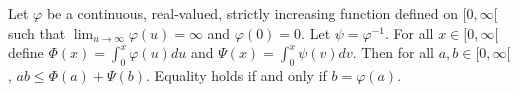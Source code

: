 Let $\varphi$ be a continuous, real-valued, strictly increasing function defined on $[0, \infty[$ such that $\lim_{u \to \infty} \varphi(u) = \infty$ and $\varphi(0) = 0$. Let $\psi = \varphi^{-1}$. For all $x \in [0, \infty[$ define $\Phi(x) = \int_0^x \varphi(u) du$ and $\Psi(x) = \int_0^x \psi(v) dv$. Then for all $a, b \in [0, \infty[$, $ab \leq \Phi(a) + \Psi(b)$. Equality holds if and only if $b = \varphi(a)$.
